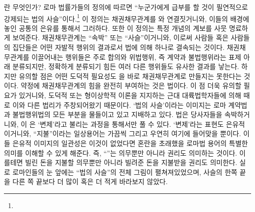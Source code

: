란 무엇인가?
로마 법률가들의 정의에 따르면
``누군가에게 급부를 할 것이 필연적으로 강제되는
법의 사슬''이다.\footnote{%
   }
이 정의는
채권채무관계를 와 연결짓거니와,
이들의 배경에 놓인 공통의 은유를 통해서 그러하다.
또한 이 정의는
특정 개념의 계보를 사뭇 명료하게 보여준다.
채권채무관계는 ``속박'' 또는 ``사슬''이거니와,
이로써
사람들 혹은 사람들의 집단들은
어떤 자발적 행위의 결과로서
법에 의해 하나로 결속되는 것이다.
채권채무관계를 이끌어내는 행위들은 주로
합의와 위법행위, 즉
계약과 불법행위라는 표제 아래 분류되지만,
정확하게 분류되기 힘든 여러 다른 행위들도 유사한 결과를 낳는다.
하지만 유의할 점은
어떤 도덕적 필요성도 을 바로 채권채무관계로 만들지는 못한다는 것이다.
약정에 채권채무관계의 힘을 완전히 부여하는 것은 법이다.
이 점 더욱 유의할 필요가 있거니와,
도덕적 또는 형이상학적 이론을 지지하는 근대 대륙법학자들에 의해
때로 이와 다른 법리가 주창되어왔기 때문이다.
`법의 사슬'이라는 이미지는
로마 계약법과 불법행위법의 모든 부분을 물들이고 있고 지배하고 있다.
법은 당사자들을 속박하거니와,
이 은 `변제'라고 불리는 과정을
통해서만 풀 수 있다.
`변제'라는 표현도 은유적이거니와,
``지불''이라는 일상용어는 가끔씩 그리고 우연히
여기에 들어맞을 뿐이다.
이들 은유적 이미지의 일관성은
이것이 없었다면 혼란을 초래했을
로마법 용어의 특별한 의미를 이해할 수 있게 해준다.
즉, ``''는 의무뿐만 아니라
권리도 의미하는 것이다.
이를테면 빌린 돈을 지불할 의무뿐만 아니라
빌려준 돈을 지불받을 권리도 의미한다.
실로 로마인들의 눈 앞에는 ``법의 사슬''의 전체 그림이
펼쳐져있었으며,
사슬의 한쪽 끝을 다른 쪽 끝보다 더 많이 혹은 더 적게
바라보지 않았다.

